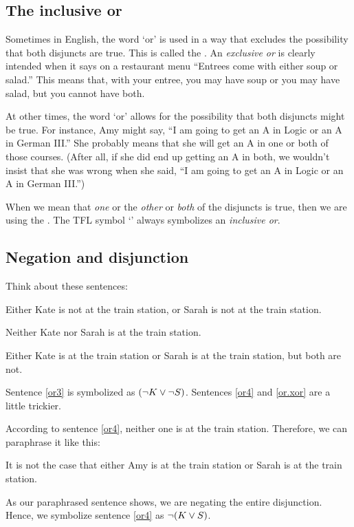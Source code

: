 \subsection{The inclusive or}\label{inclusive-or-1}

Sometimes in English, the word `or' is used in a way that excludes the possibility that both disjuncts are true. This is called the .  An \emph{exclusive or} is clearly intended when it says on a restaurant menu ``Entrees come with either soup or salad.'' This means that, with your entree, you may have soup or you may have salad, but you cannot have both.

At other times, the word `or' allows for the possibility that both disjuncts might be true. For instance, Amy might say, ``I am going to get an A in Logic or an A in German III.'' She probably means that she will get an A in one or both of those courses. (After all, if she did end up getting an A in both, we wouldn't insist that she was wrong when she said, ``I am going to get an A in Logic or an A in German III.'')

When we mean that \textit{one} or the \textit{other} or \textit{both} of the disjuncts is true, then we are using the . The TFL symbol `\eor' always symbolizes an \emph{inclusive or}.

\subsection{Negation and disjunction}

Think about these sentences:
	\begin{earg}
		\item[\ex{or3}] Either Kate is not at the train station, or Sarah is not at the train station.
		\item[\ex{or4}] Neither Kate nor Sarah is at the train station.
		\item[\ex{or.xor}] Either Kate is at the train station or Sarah is at the train station, but both are not.
	\end{earg}
Sentence \ref{or3} is symbolized as $({\neg} K \vee {\neg} S)$. Sentences \ref{or4} and \ref{or.xor} are a little trickier. 

According to sentence \ref{or4}, neither one is at the train station. Therefore, we can paraphrase it like this:
\begin{ebullet}
	\item[] It is not the case that either Amy is at the train station or Sarah is at the train station. 
\end{ebullet}
As our paraphrased sentence shows, we are negating the entire disjunction. Hence, we symbolize sentence \ref{or4} as ${\neg} (K \vee S)$. 

